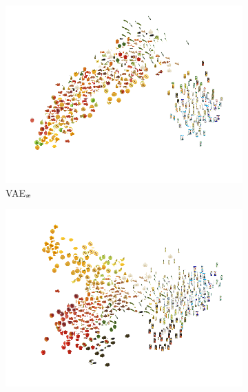 \begin{figure}
	\centering
	\vspace{-5mm}
	\begin{subfigure}[b]{0.26\textwidth}
		\centering
		\includegraphics[width=\textwidth]{Chapter1/pics_paperB/pca_latents_vae_seed2}
		\vspace{-7mm}
		\caption{VAE$_{{\bm{x}}}$}
		\label{fig:pca_latents_vae}
	\end{subfigure} 
	\hspace{-5mm}
	\begin{subfigure}[b]{0.26\textwidth}
		\centering
		\includegraphics[width=\textwidth]{Chapter1/pics_paperB/pca_latents_vcca_xiwy_seed2}

\end{subfigure}
\end{figure}
